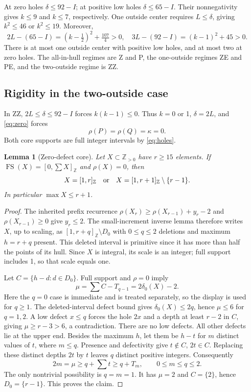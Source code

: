 \documentclass[11pt,a4paper]{article}
\newcommand{\FS}{\operatorname{FS}}
\newcommand{\Z}{\mathbb Z}
\newtheorem{lemma}[theorem]{Lemma}
\begin{document}
At zero holes $\delta\le92-I$; at positive low holes
$\delta\le65-I$. Their nonnegativity gives $k\le9$ and $k\le7$,
respectively. One outside center requires $L\le\delta$, giving
$k^2\le46$ or $k^2\le19$. Moreover,
\[
 2L-(65-I)=(k-\tfrac12)^2+\tfrac{107}{4}>0,
 \quad 3L-(92-I)=(k-1)^2+45>0.
\]
There is at most one outside center with positive low holes, and at most
two at zero holes. The all-in-hull regimes are Z and P, the one-outside
regimes ZE and PE, and the two-outside regime is ZZ.

\subsection{Rigidity in the two-outside case}
In ZZ, $2L\le\delta\le92-I$ forces $k(k-1)\le0$. Thus $k=0$ or 1,
$\delta=2L$, and \eqref{eq:zero} forces
\begin{equation}\label{eq:rigid}
 \rho(P)=\rho(Q)=\kappa=0.
\end{equation}
Both core supports are full integer intervals by \eqref{eq:holes}.

\begin{lemma}[Zero-defect core]\label{lem:core}
Let $X\subset\Z_{>0}$ have $r\ge15$ elements. If
$\FS(X)=[0,\sum X]_{\Z}$ and $\rho(X)=0$, then
\[
 X=[1,r]_{\Z}\quad\hbox{or}\quad
 X=[1,r+1]_{\Z}\setminus\{r-1\}.
\]
In particular $\max X\le r+1$.
\end{lemma}
\begin{proof}
The inherited prefix recurrence
$\rho(X_r)\ge\rho(X_{r-1})+y_r-2$ and
$\rho(X_{r-1})\ge0$ give $y_r\le2$.
The small-increment inverse lemma therefore writes $X$, up to scaling,
as $[1,r+q]_{\Z}\setminus D_0$ with $0\le q\le2$ deletions and maximum
$h=r+q$ present. This deleted interval is primitive since it has more
than half the points of its hull. Since $X$ is integral, its scale is an
integer; full support includes 1, so that scale equals one.

Let $C=\{h-d:d\in D_0\}$. Full support and $\rho=0$ imply
\[
 \mu=\sum C-T_{q-1}=2\delta_0(X)-2.
\]
Here the $q=0$ case is immediate and is treated separately, so the
display is used for $q\ge1$. The deleted-interval defect bound gives
$\delta_0(X)\le2q$, hence $\mu\le6$ for $q=1,2$.
A low defect $x\le q$ forces the hole $2x$ and a depth at least $r-2$
in $C$, giving $\mu\ge r-3>6$, a contradiction. There are no low defects.
All other defects lie at the upper end. Besides the maximum $h$, let
them be $h-t$ for $m$ distinct values of $t$, where $m\le q$.
Presence and defectivity give $t\notin C$, $2t\in C$.
Replacing these distinct depths $2t$ by $t$ leaves $q$ distinct positive
integers. Consequently
\[
 2m=\mu\ge q+\sum t\ge q+T_m,\qquad 0\le m\le q\le2.
\]
The only nontrivial possibility is $q=m=1$. It has $\mu=2$ and
$C=\{2\}$, hence $D_0=\{r-1\}$. This proves the claim.
\end{proof}
\end{document}
